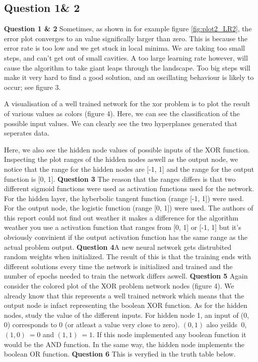 \documentclass[a4paper]{article}
\begin{document}
\subsection*{Question 1\& 2}
\textbf{Question 1 \& 2} Sometimes, as shown in for example figure \ref{fig:plot2_LR2}, 
the error plot converges to an value significally larger than zero.
This is because the error rate is too low and we get stuck in local minima. We are 
taking too small steps, and can't get out of small cavities. A too large learning 
rate however, will cause the algorithm to take giant leaps through the landscape. 
Too big steps will make it very hard to find a good solution, and an oscillating 
behaviour is likely to occur; see figure 3. 

A visualisation of a well trained network for the xor problem  
is to plot the result of various values 
as colors (figure 4). 
Here, we can see the classification of the possible input values. We can 
clearly see the two hyperplanes generated that seperates data. 

Here, we also see the hidden node values of possible inputs of the XOR function.
Inspecting the plot ranges of the hidden nodes aswell as the output node, we notice that
the range for the hidden nodes are [-1, 1] and the range for the output function is [0, 1].
\textbf{Question 3} The reason that the ranges differs is that two 
different sigmoid functions were used as activation functions used for the network. 
For the hidden layer, the hyberbolic tangent function (range [-1, 1]) were used. 
For the output node, the logistic function (range [0, 1]) were used. The authors of 
this report could not find out weather it makes a difference for the algorithm weather 
you use a activation function that ranges from [0, 1] or [-1, 1] but it's obviously 
convinient if the output activation function has the same range as the actual problem 
output. \textbf{Question 4}A new neural network gets distrubited random weights 
when initialized. The result of this is that the training ends with different 
solutions every time the network is initialized and trained and the 
number of epochs needed to train the network differs aswell. 
\textbf{Question 5} Again consider the colored plot of the XOR problem 
network nodes (figure 4). We already 
know that this represents a well trained network which means that the output node is 
infact representing the boolean XOR function. As for the hidden nodes, study the value 
of the different inputs. For hidden node 1, an input of (0, 0) corresponds to 0 (or 
atleast a value very close to zero). $(0, 1)$ also yeilds $~ 0$, $(1, 0) ~= 0$ and 
$(1, 1) ~= 1$. If this node implemented any boolean function it would be the AND function.
In the same way, the hidden node implements the boolean OR function. 
\textbf{Question 6} This is veryfied in the truth table below. 
\end{document}
